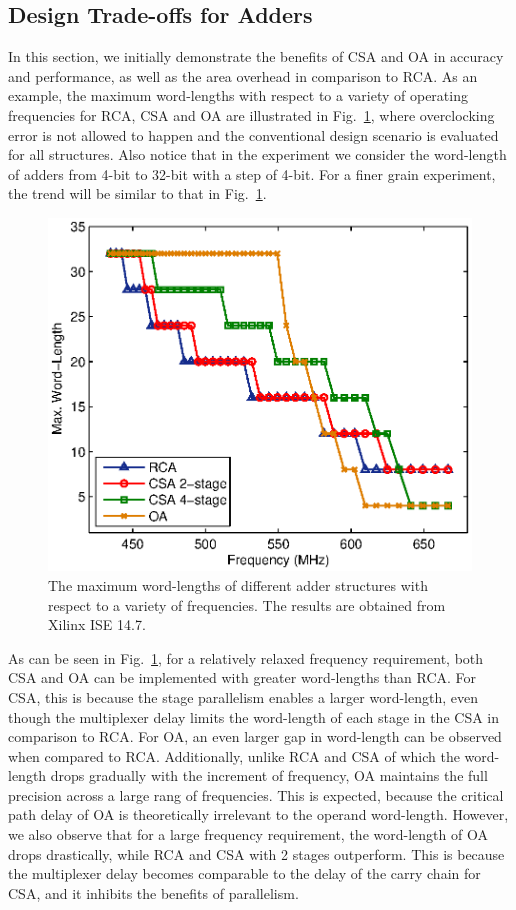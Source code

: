 \documentclass[10pt, conference, compsocconf]{IEEEtran}
\begin{document}
\subsection{Design Trade-offs for Adders}
In this section, we initially demonstrate the benefits of CSA and OA in accuracy and performance, as well as the area overhead in comparison to RCA. As an example, the maximum word-lengths with respect to a variety of operating frequencies for RCA, CSA and OA are illustrated in Fig.~\ref{Fig:max_wl_adder}, where overclocking error is not allowed to happen and the conventional design scenario is evaluated for all structures. Also notice that in the experiment we consider the word-length of adders from 4-bit to 32-bit with a step of 4-bit. For a finer grain experiment, the trend will be similar to that in Fig.~\ref{Fig:max_wl_adder}.
%
\begin{figure}[tbp]
  \centering
  \includegraphics[width=.5\textwidth]{./figures/exp/max_wl.eps}
  \vspace{-4ex}
  \caption{The maximum word-lengths of different adder structures with respect to a variety of frequencies. The results are obtained from Xilinx ISE 14.7.}
  \label{Fig:max_wl_adder}
\end{figure}

As can be seen in Fig.~\ref{Fig:max_wl_adder}, for a relatively relaxed frequency requirement, both CSA and OA can be implemented with greater word-lengths than RCA. For CSA, this is because the stage parallelism enables a larger word-length, even though the multiplexer delay limits the word-length of each stage in the CSA in comparison to RCA. For OA, an even larger gap in word-length can be observed when compared to RCA. Additionally, unlike RCA and CSA of which the word-length drops gradually with the increment of frequency, OA maintains the full precision across a large rang of frequencies. This is expected, because the critical path delay of OA is theoretically irrelevant to the operand word-length. However, we also observe that for a large frequency requirement, the word-length of OA drops drastically, while RCA and CSA with 2 stages outperform. This is because the multiplexer delay becomes comparable to the delay of the carry chain for CSA, and it inhibits the benefits of parallelism. 
\end{document}
